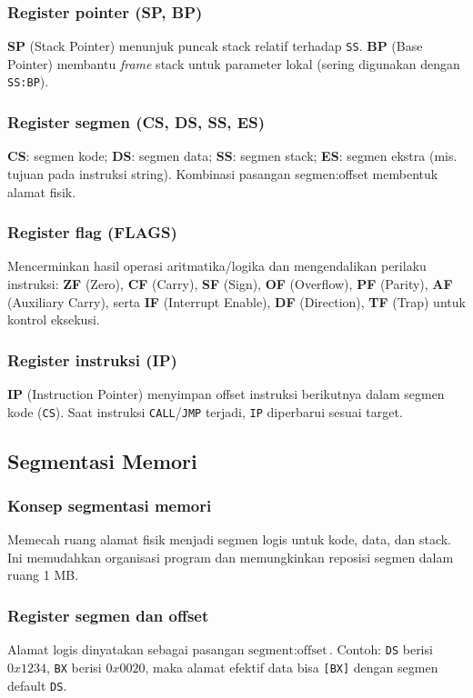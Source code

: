 \subsubsection{Register pointer (SP, BP)}
\textbf{SP} (Stack Pointer) menunjuk puncak stack relatif terhadap \texttt{SS}. \textbf{BP} (Base Pointer) membantu \textit{frame} stack untuk parameter lokal (sering digunakan dengan \texttt{SS:BP}).

\subsubsection{Register segmen (CS, DS, SS, ES)}
\textbf{CS}: segmen kode; \textbf{DS}: segmen data; \textbf{SS}: segmen stack; \textbf{ES}: segmen ekstra (mis. tujuan pada instruksi string). Kombinasi pasangan segmen:offset membentuk alamat fisik.

\subsubsection{Register flag (FLAGS)}
Mencerminkan hasil operasi aritmatika/logika dan mengendalikan perilaku instruksi: \textbf{ZF} (Zero), \textbf{CF} (Carry), \textbf{SF} (Sign), \textbf{OF} (Overflow), \textbf{PF} (Parity), \textbf{AF} (Auxiliary Carry), serta \textbf{IF} (Interrupt Enable), \textbf{DF} (Direction), \textbf{TF} (Trap) untuk kontrol eksekusi.

\subsubsection{Register instruksi (IP)}
\textbf{IP} (Instruction Pointer) menyimpan offset instruksi berikutnya dalam segmen kode (\texttt{CS}). Saat instruksi \texttt{CALL}/\texttt{JMP} terjadi, \texttt{IP} diperbarui sesuai target.

\subsection{Segmentasi Memori}
\subsubsection{Konsep segmentasi memori}
Memecah ruang alamat fisik menjadi segmen logis untuk kode, data, dan stack. Ini memudahkan organisasi program dan memungkinkan reposisi segmen dalam ruang 1 MB.

\subsubsection{Register segmen dan offset}
Alamat logis dinyatakan sebagai pasangan \(\text{segment}:\text{offset}\). Contoh: \texttt{DS} berisi \(0x1234\), \texttt{BX} berisi \(0x0020\), maka alamat efektif data bisa \texttt{[BX]} dengan segmen default \texttt{DS}.

